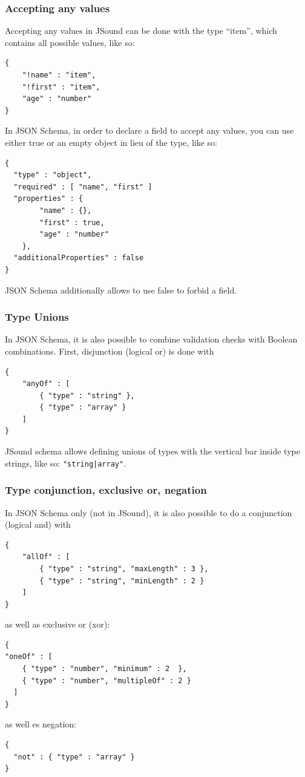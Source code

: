 \subsubsection{Accepting any values}
Accepting any values in JSound can be done with the type “item”, which contains all possible values, like so:
\begin{lstlisting}[style=json]
{
    "!name" : "item",
    "!first" : "item",
    "age" : "number"
}
\end{lstlisting}
In JSON Schema, in order to declare a field to accept any values, you can use either true or an empty object in lieu of the type, like so:
\begin{lstlisting}[style=json]
{
  "type" : "object",
  "required" : [ "name", "first" ]
  "properties" : {
        "name" : {},
        "first" : true,
        "age" : "number"
    },
  "additionalProperties" : false
}
\end{lstlisting}
JSON Schema additionally allows to use false to forbid a field.

\subsubsection{Type Unions}
In JSON Schema, it is also possible to combine validation checks with Boolean combinations.
First, disjunction (logical or) is done with
\begin{lstlisting}[style=json]
{
    "anyOf" : [
        { "type" : "string" },
        { "type" : "array" }
    ]
}
\end{lstlisting}
JSound schema allows defining unions of types with the vertical bar inside type strings, like so: \texttt{"string|array"}.

\subsubsection{Type conjunction, exclusive or, negation}
In JSON Schema only (not in JSound), it is also possible to do a conjunction (logical and) with
\begin{lstlisting}[style=json]
{
    "allOf" : [
        { "type" : "string", "maxLength" : 3 },
        { "type" : "string", "minLength" : 2 }
    ]
}
\end{lstlisting}
as well as exclusive or (xor):
\begin{lstlisting}[style=json]
{
"oneOf" : [
    { "type" : "number", "minimum" : 2  },
    { "type" : "number", "multipleOf" : 2 }
  ]
}
\end{lstlisting}
as well es negation:
\begin{lstlisting}[style=json]
{
  "not" : { "type" : "array" }
}
\end{lstlisting}

